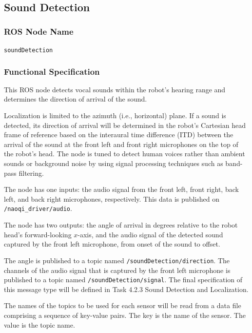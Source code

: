 \documentclass{CSSRforAfrica}
\begin{document}
{{\newpage

\subsection{Sound Detection }

\subsubsection*{ROS Node Name}
 {\small \verb+soundDetection+}   

\subsubsection*{Functional Specification}
This ROS node detects vocal sounds within the robot's hearing range and determines the direction of arrival of the sound.

Localization is limited to the azimuth (i.e., horizontal) plane.  If a sound is detected, its direction of arrival will be determined in the robot's Cartesian head frame of reference based on the interaural time difference (ITD) between the arrival of the sound at the front left and front right  microphones on the top of the robot's head.  The node is tuned to detect human voices rather than ambient sounds or background noise  by using signal processing techniques such as band-pass filtering.

The node has one inputs: the audio signal from the front left, front right, back left, and back right microphones, respectively.  This data is published on  {\small \verb+/naoqi_driver/audio+}.
 
The node has two outputs: the  angle  of arrival in degrees relative to the robot head's forward-looking $x$-axis, and the audio signal of the detected sound captured by the front left microphone, from onset of the sound to offset.

The angle is published to a topic named {\small \verb+/soundDetection/direction+}.   The  channels of the audio signal that is captured by the front left microphone is  published to a  topic named {\small \verb+/soundDetection/signal+}.  The final specification of this message type will be defined in Task 4.2.3 Sound Detection and Localization.

The names of the topics to be used for each sensor will be read from a data file comprising a sequence of key-value pairs. The key is the name of the sensor. The value is the topic name.   

}}
\end{document}
